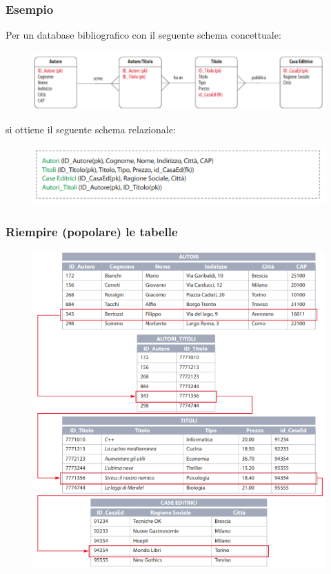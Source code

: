 \documentclass[]{beamer}
\begin{document}
\begin{frame}
\frametitle{Esempio}
Per un database bibliografico con il seguente schema concettuale:
\begin{figure}
  \includegraphics[width=\columnwidth]{img/ristrutturazione11.png}
\end{figure}
si ottiene il seguente schema relazionale:
\begin{figure}
  \includegraphics[width=.9\columnwidth]{img/ristrutturazione12.png}
\end{figure}
\end{frame}



\begin{frame}
\frametitle{Riempire (popolare) le tabelle}
\begin{figure}
  \includegraphics[width=.6\columnwidth]{img/ristrutturazione13.png}
\end{figure}
\end{frame}
\end{document}
